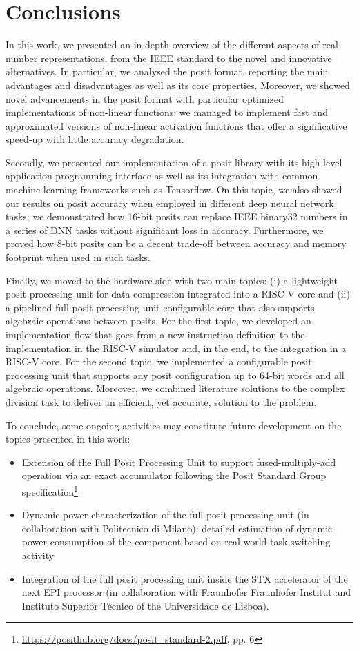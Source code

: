 \chapter{Conclusions}
In this work, we presented an in-depth overview of the different aspects of real number representations, from the IEEE standard to the novel and innovative alternatives. In particular, we analysed the posit format, reporting the main advantages and disadvantages as well as its core properties. Moreover, we showed novel advancements in the posit format with particular optimized implementations of non-linear functions; we managed to implement fast and approximated versions of non-linear activation functions that offer a significative speed-up with little accuracy degradation.

Secondly, we presented our implementation of a posit library with its high-level application programming interface as well as its integration with common machine learning frameworks such as Tensorflow. On this topic, we also showed our results on posit accuracy when employed in different deep neural network tasks; we demonstrated how 16-bit posits can replace IEEE binary32 numbers in a series of DNN tasks without significant loss in accuracy. Furthermore, we proved how 8-bit posits can be a decent trade-off between accuracy and memory footprint when used in such tasks.

Finally, we moved to the hardware side with two main topics: (i) a lightweight posit processing unit for data compression integrated into a RISC-V core and (ii) a pipelined full posit processing unit configurable core that also supports algebraic operations between posits. For the first topic, we developed an implementation flow that goes from a new instruction definition to the implementation in the RISC-V simulator and, in the end, to the integration in a RISC-V core. For the second topic, we implemented a configurable posit processing unit that supports any posit configuration up to 64-bit words and all algebraic operations. Moreover, we combined literature solutions to the complex division task to deliver an efficient, yet accurate, solution to the problem.

To conclude, some ongoing activities may constitute future development on the topics presented in this work:
\begin{itemize}
    \item Extension of the Full Posit Processing Unit to support fused-multiply-add operation via an exact accumulator following the Posit Standard Group specification\footnote{\url{https://posithub.org/docs/posit_standard-2.pdf}, pp. 6}
    \item Dynamic power characterization of the full posit processing unit (in collaboration with Politecnico di Milano): detailed estimation of dynamic power consumption of the component based on real-world task switching activity
    \item Integration of the full posit processing unit inside the STX accelerator of the next EPI processor (in collaboration with Fraunhofer Fraunhofer Institut and Instituto Superior Técnico of the Universidade de Lisboa).
\end{itemize}